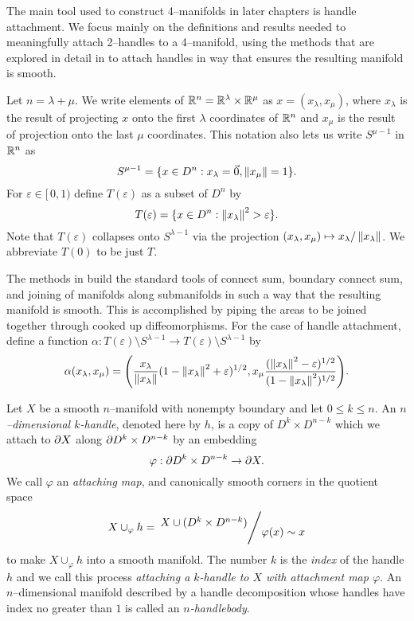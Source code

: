 The main tool used to construct 4--manifolds in later chapters is handle attachment.
We focus mainly on the definitions and results needed to meaningfully attach 2--handles to a 4--manifold, using the methods that are explored in detail in \cite{Kosi93} to attach handles in way that ensures the resulting manifold is smooth.

Let $n=\lambda+\mu$.
We write elements of $\mathbb{R}^n=\mathbb{R}^\lambda\times\mathbb{R}^\mu$ as $x=(x_\lambda,x_\mu)$, where $x_\lambda$ is the result of projecting $x$ onto the first $\lambda$ coordinates of $\mathbb{R}^n$ and $x_\mu$ is the result of projection onto the last $\mu$ coordinates.
This notation also lets us write $S^{\mu-1}$ in $\mathbb{R}^n$ as
\[
	S^{\mu-1} = \{x\in D^n: x_\lambda=\vec{0},\left\lVert x_\mu \right\rVert=1\}.
\]
For $\varepsilon\in [\,0,1)$ define $T(\varepsilon)$ as a subset of $D^n$ by
\[
	T(\varepsilon) = \{x\in D^n: \left\lVert x_\lambda \right\rVert^2>\varepsilon\}.
\]
Note that $T(\varepsilon)$ collapses onto $S^{\lambda-1}$ via the projection $(x_\lambda,x_\mu)\mapsto x_\lambda/\left\lVert x_\lambda \right\rVert$.
We abbreviate $T(0)$ to be just $T$.

The methods in \cite{Kosi93} build the standard tools of connect sum, boundary connect sum, and joining of manifolds along submanifolds in such a way that the resulting manifold is smooth.
This is accomplished by piping the areas to be joined together through cooked up diffeomorphisms.
For the case of handle attachment, define a function $
	\alpha:T(\varepsilon)\setminus S^{\lambda-1} \to T(\varepsilon)\setminus S^{\lambda-1}
$ by
\[
	\alpha(x_\lambda, x_\mu) =
	\Bigg( 
		\frac{x_\lambda}{\left\lVert x_\lambda \right\rVert}
		(1-\left\lVert x_\lambda \right\rVert^2+\varepsilon)^{1/2},
		x_\mu
		\frac{
			(\left\lVert x_\lambda \right\rVert^2-\varepsilon)^{1/2}
		}{
			(1-\left\lVert x_\lambda \right\rVert^2)^{1/2}
		}
	\Bigg).
\]



\begin{defn}
	\label{def:handle}	
	Let $X$ be a smooth $n$--manifold with nonempty boundary and let $0\leq k\leq n$.
	An \emph{$n$--dimensional $k$-handle}, denoted here by $h$, is a copy of $D^k\times D^{n-k}$ which we attach to $\partial X$ along $\partial D^k\times D^{n-k}$ by an embedding
	\[
	  \varphi : \partial D^k \times D^{n-k} \to \partial X.
	\]
	We call $\varphi$ an \emph{attaching map}, and canonically smooth corners \cite{GompStip} in the quotient space
	\[
	  X\cup_\varphi h = \quotient{X \cup ( D^k\times D^{n-k} ) }{ \varphi(x) \sim x }
	\]
	to make $X\cup_\varphi h$ into a smooth manifold.
	The number $k$ is the \emph{index} of the handle $h$ and we call this process \emph{attaching a $k$-handle to $X$ with attachment map $\varphi$}.
	An $n$--dimensional manifold described by a handle decomposition whose handles have index no greater than $1$ is called an \emph{$n$-handlebody}.
\end{defn}

